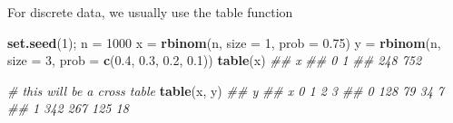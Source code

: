 \documentclass[
]{article}
\newenvironment{Shaded}{\begin{snugshade}}{\end{snugshade}}
\newcommand{\CommentTok}[1]{\textcolor[rgb]{0.56,0.35,0.01}{\textit{#1}}}
\newcommand{\DataTypeTok}[1]{\textcolor[rgb]{0.13,0.29,0.53}{#1}}
\newcommand{\DecValTok}[1]{\textcolor[rgb]{0.00,0.00,0.81}{#1}}
\newcommand{\FloatTok}[1]{\textcolor[rgb]{0.00,0.00,0.81}{#1}}
\newcommand{\KeywordTok}[1]{\textcolor[rgb]{0.13,0.29,0.53}{\textbf{#1}}}
\newcommand{\NormalTok}[1]{#1}
\newcommand{\StringTok}[1]{\textcolor[rgb]{0.31,0.60,0.02}{#1}}
\begin{document}
\begin{Shaded}
\end{Shaded}

\vspace{12pt}

For discrete data, we usually use the table function

\begin{Shaded}
\begin{Highlighting}[]
    \KeywordTok{set.seed}\NormalTok{(}\DecValTok{1}\NormalTok{); n =}\StringTok{ }\DecValTok{1000}
\NormalTok{    x =}\StringTok{ }\KeywordTok{rbinom}\NormalTok{(n, }\DataTypeTok{size =} \DecValTok{1}\NormalTok{, }\DataTypeTok{prob =} \FloatTok{0.75}\NormalTok{)}
\NormalTok{    y =}\StringTok{ }\KeywordTok{rbinom}\NormalTok{(n, }\DataTypeTok{size =} \DecValTok{3}\NormalTok{, }\DataTypeTok{prob =} \KeywordTok{c}\NormalTok{(}\FloatTok{0.4}\NormalTok{, }\FloatTok{0.3}\NormalTok{, }\FloatTok{0.2}\NormalTok{, }\FloatTok{0.1}\NormalTok{))}
    \KeywordTok{table}\NormalTok{(x)}
\CommentTok{## x}
\CommentTok{##   0   1 }
\CommentTok{## 248 752}
    
    \CommentTok{# this will be a cross table}
    \KeywordTok{table}\NormalTok{(x, y)}
\CommentTok{##    y}
\CommentTok{## x     0   1   2   3}
\CommentTok{##   0 128  79  34   7}
\CommentTok{##   1 342 267 125  18}
\end{Highlighting}
\end{Shaded}
\end{document}

